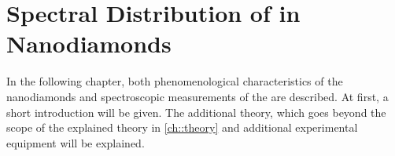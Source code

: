 
\chapter[Spectral Distribution]{Spectral Distribution of \sivs in Nanodiamonds}	\label{ch::distribution}


	In the following chapter, both phenomenological characteristics of the nanodiamonds and spectroscopic measurements of the \sivs are described.
	At first, a short introduction will be given.
	The additional theory, which goes beyond the scope of the explained theory in \autoref{ch::theory} and additional experimental equipment will be explained.



	
	
	
	
	
	
